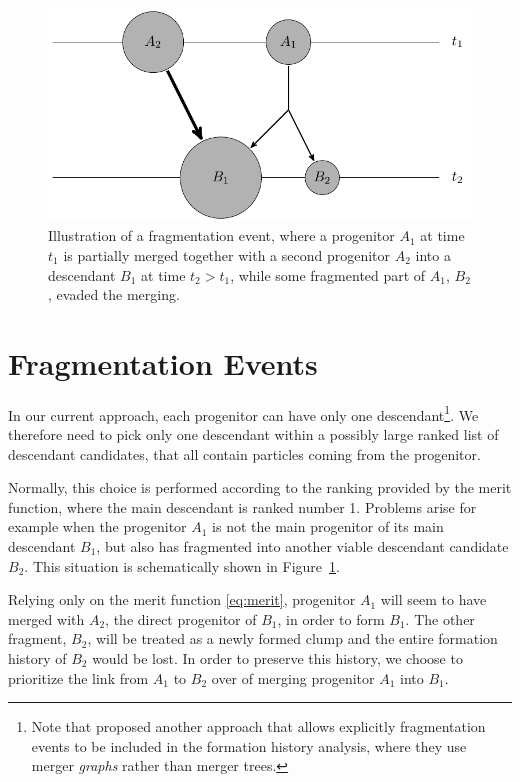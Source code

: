\begin{figure}
  \centering
  \includegraphics[width=.7\linewidth]{./figures/ACACIA/tikz/fracture.pdf}
  \caption{Illustration of a fragmentation event, where a
  	progenitor $A_1$ at time $t_1$ is partially merged together
  	with a second progenitor $A_2$ into a descendant $B_1$ at
  	time $t_2 > t_1$, while some fragmented part of $A_1$, $B_2$,
  	evaded the merging.
	}
  \label{fig:fracture}
\end{figure}

\section{Fragmentation Events}
\label{sect:frag}

In our current approach, each progenitor can have only one
descendant\footnote{Note that \cite{springelSimulatingCosmicStructure2021}
proposed another approach that allows explicitly fragmentation
events to be included in the formation history analysis, where they use
merger \emph{graphs} rather than merger trees.}. We therefore need
to pick only one descendant within a possibly large ranked list of
descendant candidates, that all contain particles coming from the
progenitor.

Normally, this choice is performed according to the ranking provided
by the merit function, where the main descendant is ranked number 1.
Problems arise for example when the progenitor $A_1$ is not the main
progenitor of its main descendant $B_1$, but also has fragmented into
another viable descendant candidate $B_2$.  This situation is
schematically shown in Figure~\ref{fig:fracture}.

Relying only on the merit function \eqref{eq:merit}, progenitor $A_1$
will seem to have merged with $A_2$, the direct progenitor of $B_1$,
in order to form $B_1$.  The other fragment, $B_2$, will be treated as
a newly formed clump and the entire formation history of $B_2$ would
be lost. In order to preserve this history, we choose to prioritize the
link from $A_1$ to $B_2$ over of merging progenitor $A_1$ into $B_1$.


